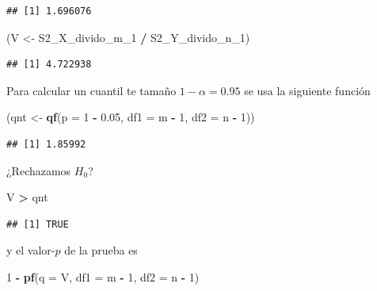 \documentclass[
  12pt,
]{book}
\newenvironment{Shaded}{\begin{snugshade}}{\end{snugshade}}
\newcommand{\DataTypeTok}[1]{\textcolor[rgb]{0.13,0.29,0.53}{#1}}
\newcommand{\DecValTok}[1]{\textcolor[rgb]{0.00,0.00,0.81}{#1}}
\newcommand{\FloatTok}[1]{\textcolor[rgb]{0.00,0.00,0.81}{#1}}
\newcommand{\KeywordTok}[1]{\textcolor[rgb]{0.13,0.29,0.53}{\textbf{#1}}}
\newcommand{\NormalTok}[1]{#1}
\newcommand{\OperatorTok}[1]{\textcolor[rgb]{0.81,0.36,0.00}{\textbf{#1}}}
\newcommand{\StringTok}[1]{\textcolor[rgb]{0.31,0.60,0.02}{#1}}
\begin{document}
\begin{verbatim}
## [1] 1.696076
\end{verbatim}

\begin{Shaded}
\begin{Highlighting}[]
\NormalTok{(V \textless{}{-}}\StringTok{ }\NormalTok{S2\_X\_divido\_m\_}\DecValTok{1} \OperatorTok{/}\StringTok{ }\NormalTok{S2\_Y\_divido\_n\_}\DecValTok{1}\NormalTok{)}
\end{Highlighting}
\end{Shaded}

\begin{verbatim}
## [1] 4.722938
\end{verbatim}

Para calcular un cuantil te tamaño \(1-\alpha = 0.95\) se usa la siguiente función

\begin{Shaded}
\begin{Highlighting}[]
\NormalTok{(qnt \textless{}{-}}\StringTok{ }\KeywordTok{qf}\NormalTok{(}\DataTypeTok{p =} \DecValTok{1} \OperatorTok{{-}}\StringTok{ }\FloatTok{0.05}\NormalTok{, }\DataTypeTok{df1 =}\NormalTok{ m }\OperatorTok{{-}}\StringTok{ }\DecValTok{1}\NormalTok{, }\DataTypeTok{df2 =}\NormalTok{ n }\OperatorTok{{-}}\StringTok{ }\DecValTok{1}\NormalTok{))}
\end{Highlighting}
\end{Shaded}

\begin{verbatim}
## [1] 1.85992
\end{verbatim}

¿Rechazamos \(H_0\)?

\begin{Shaded}
\begin{Highlighting}[]
\NormalTok{V }\OperatorTok{\textgreater{}}\StringTok{ }\NormalTok{qnt}
\end{Highlighting}
\end{Shaded}

\begin{verbatim}
## [1] TRUE
\end{verbatim}

y el valor-\(p\) de la prueba es

\begin{Shaded}
\begin{Highlighting}[]
\DecValTok{1} \OperatorTok{{-}}\StringTok{ }\KeywordTok{pf}\NormalTok{(}\DataTypeTok{q =}\NormalTok{ V, }\DataTypeTok{df1 =}\NormalTok{ m }\OperatorTok{{-}}\StringTok{ }\DecValTok{1}\NormalTok{, }\DataTypeTok{df2 =}\NormalTok{ n }\OperatorTok{{-}}\StringTok{ }\DecValTok{1}\NormalTok{)}
\end{Highlighting}
\end{Shaded}
\end{document}
